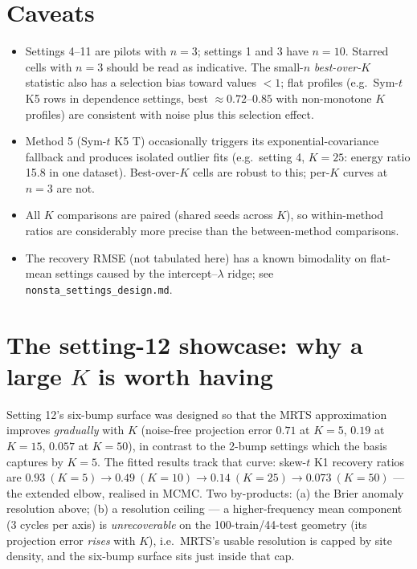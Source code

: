 \documentclass[11pt]{article}
\begin{document}
\section{Caveats}

\begin{itemize}
\item Settings 4--11 are pilots with $n = 3$; settings 1 and 3 have $n = 10$.
Starred cells with $n=3$ should be read as indicative. The small-$n$
\emph{best-over-}$K$ statistic also has a selection bias toward values $<1$;
flat profiles (e.g.\ Sym-$t$ K5 rows in dependence settings, best
$\approx 0.72$--$0.85$ with non-monotone $K$ profiles) are consistent with
noise plus this selection effect.
\item Method 5 (Sym-$t$ K5 T) occasionally triggers its exponential-covariance
fallback and produces isolated outlier fits (e.g.\ setting 4, $K=25$: energy
ratio 15.8 in one dataset). Best-over-$K$ cells are robust to this; per-$K$
curves at $n=3$ are not.
\item All $K$ comparisons are paired (shared seeds across $K$), so
within-method ratios are considerably more precise than the between-method
comparisons.
\item The recovery RMSE (not tabulated here) has a known bimodality on
flat-mean settings caused by the intercept--$\lambda$ ridge; see
\texttt{nonsta\_settings\_design.md}.
\end{itemize}

\section{The setting-12 showcase: why a large $K$ is worth having}

Setting 12's six-bump surface was designed so that the MRTS approximation
improves \emph{gradually} with $K$ (noise-free projection error $0.71$ at
$K{=}5$, $0.19$ at $K{=}15$, $0.057$ at $K{=}50$), in contrast to the 2-bump
settings which the basis captures by $K{=}5$. The fitted results track that
curve: skew-$t$ K1 recovery ratios are $0.93\ (K{=}5) \to 0.49\ (K{=}10) \to
0.14\ (K{=}25) \to 0.073\ (K{=}50)$ --- the extended elbow, realised in MCMC.
Two by-products: (a) the Brier anomaly resolution above; (b) a resolution
ceiling --- a higher-frequency mean component (3 cycles per axis) is
\emph{unrecoverable} on the 100-train/44-test geometry (its projection error
\emph{rises} with $K$), i.e.\ MRTS's usable resolution is capped by site
density, and the six-bump surface sits just inside that cap.
\end{document}
